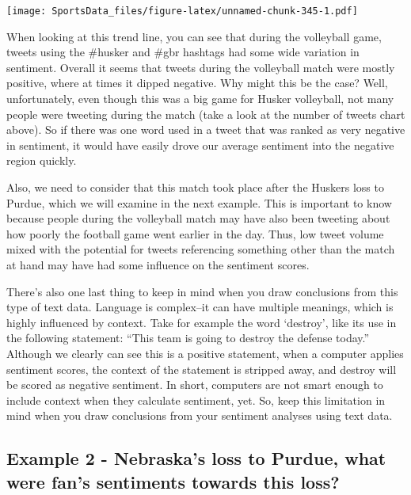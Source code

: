 \documentclass[
]{book}
\begin{document}
\texttt{[image: SportsData\_files/figure-latex/unnamed-chunk-345-1.pdf]}

When looking at this trend line, you can see that during the volleyball game, tweets using the \#husker and \#gbr hashtags had some wide variation in sentiment. Overall it seems that tweets during the volleyball match were mostly positive, where at times it dipped negative. Why might this be the case? Well, unfortunately, even though this was a big game for Husker volleyball, not many people were tweeting during the match (take a look at the number of tweets chart above). So if there was one word used in a tweet that was ranked as very negative in sentiment, it would have easily drove our average sentiment into the negative region quickly.

Also, we need to consider that this match took place after the Huskers loss to Purdue, which we will examine in the next example. This is important to know because people during the volleyball match may have also been tweeting about how poorly the football game went earlier in the day. Thus, low tweet volume mixed with the potential for tweets referencing something other than the match at hand may have had some influence on the sentiment scores.

There's also one last thing to keep in mind when you draw conclusions from this type of text data. Language is complex--it can have multiple meanings, which is highly influenced by context. Take for example the word `destroy', like its use in the following statement: ``This team is going to destroy the defense today.'' Although we clearly can see this is a positive statement, when a computer applies sentiment scores, the context of the statement is stripped away, and destroy will be scored as negative sentiment. In short, computers are not smart enough to include context when they calculate sentiment, yet. So, keep this limitation in mind when you draw conclusions from your sentiment analyses using text data.

\hypertarget{example-2---nebraskas-loss-to-purdue-what-were-fans-sentiments-towards-this-loss}{%
\subsection{Example 2 - Nebraska's loss to Purdue, what were fan's sentiments towards this loss?}\label{example-2---nebraskas-loss-to-purdue-what-were-fans-sentiments-towards-this-loss}}
\end{document}
